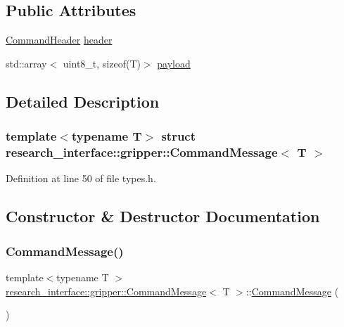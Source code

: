 \subsection*{Public Attributes}
\begin{DoxyCompactItemize}
\item 
\hyperlink{structresearch__interface_1_1gripper_1_1CommandHeader}{Command\+Header} \hyperlink{structresearch__interface_1_1gripper_1_1CommandMessage_ae32966ef012e8fc0355a775944a8cc55}{header}
\item 
std\+::array$<$ uint8\+\_\+t, sizeof(T)$>$ \hyperlink{structresearch__interface_1_1gripper_1_1CommandMessage_ac59db82ea1c4c1da955d22f8eac3c2df}{payload}
\end{DoxyCompactItemize}


\subsection{Detailed Description}
\subsubsection*{template$<$typename T$>$\newline
struct research\+\_\+interface\+::gripper\+::\+Command\+Message$<$ T $>$}



Definition at line 50 of file types.\+h.



\subsection{Constructor \& Destructor Documentation}
\mbox{\label{structresearch__interface_1_1gripper_1_1CommandMessage_ad72fdd9aedd7efefa2fa7038483a7511}} 
\subsubsection{\texorpdfstring{Command\+Message()}{CommandMessage()}\hspace{0.1cm}{\footnotesize\ttfamily [1/2]}}
{\footnotesize\ttfamily template$<$typename T $>$ \\
\hyperlink{structresearch__interface_1_1gripper_1_1CommandMessage}{research\+\_\+interface\+::gripper\+::\+Command\+Message}$<$ T $>$\+::\hyperlink{structresearch__interface_1_1gripper_1_1CommandMessage}{Command\+Message} (\begin{DoxyParamCaption}{ }\end{DoxyParamCaption})\hspace{0.3cm}{\ttfamily [default]}}

